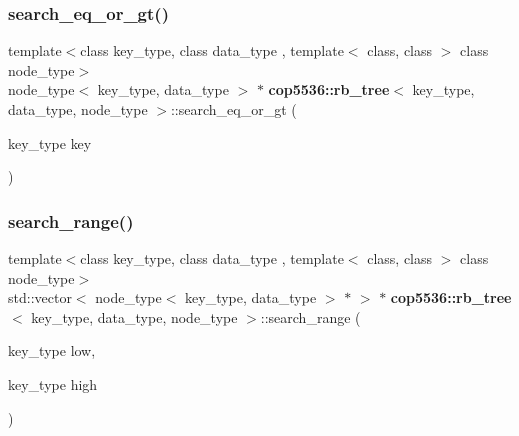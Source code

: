 \mbox{\label{classcop5536_1_1rb__tree_a07e46d07e6210465f30a6fd5486a9dac}} 
\subsubsection{search\_eq\_or\_gt()}
{\footnotesize\ttfamily template$<$class key\+\_\+type, class data\+\_\+type , template$<$ class, class $>$ class node\+\_\+type$>$ \\
node\+\_\+type$<$ key\+\_\+type, data\+\_\+type $>$ $\ast$ \textbf{ cop5536\+::rb\+\_\+tree}$<$ key\+\_\+type, data\+\_\+type, node\+\_\+type $>$\+::search\+\_\+eq\+\_\+or\+\_\+gt (\begin{DoxyParamCaption}\item[{key\+\_\+type}]{key }\end{DoxyParamCaption})\hspace{0.3cm}{\ttfamily [inline]}}

\mbox{\label{classcop5536_1_1rb__tree_a222eb0ee0c9d1e02efd9192edb04a990}} 
\subsubsection{search\_range()}
{\footnotesize\ttfamily template$<$class key\+\_\+type, class data\+\_\+type , template$<$ class, class $>$ class node\+\_\+type$>$ \\
std\+::vector$<$ node\+\_\+type$<$ key\+\_\+type, data\+\_\+type $>$ $\ast$ $>$ $\ast$ \textbf{ cop5536\+::rb\+\_\+tree}$<$ key\+\_\+type, data\+\_\+type, node\+\_\+type $>$\+::search\+\_\+range (\begin{DoxyParamCaption}\item[{key\+\_\+type}]{low,  }\item[{key\+\_\+type}]{high }\end{DoxyParamCaption})\hspace{0.3cm}{\ttfamily [inline]}}

